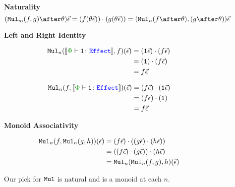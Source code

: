 \documentclass{report}
\begin{document}
\begin{figure}
    \begin{framed}
        \begin{framed}
            \centering\textbf{Naturality} 
            \begin{equation*}
                (\Mul_m(f, g)\after \theta)\ev = (f(\theta\ev))\dot(g(\theta\ev)) = (\Mul_n(f\after\theta), (g\after\theta))\ev
            \end{equation*}
        \end{framed} 
        
        \begin{framed}
            \centering\textbf{Left and Right Identity}
            \begin{minipage}{.45\textwidth}
                \begin{align*}
                    \Mul_n(\deno{\typerelation{\P}{\1}{\effect}}, f)(\ev) & = (\1\ev)\dot(f\ev)\\
                    & = (\1)\dot(f\ev)\\
                    & = f\ev\\
                \end{align*}
            \end{minipage}
            \quad
            \begin{minipage}{.45\textwidth}
                \begin{align*}
                    \Mul_n(f, \deno{\typerelation{\P}{\1}{\effect}})(\ev) & = (f\ev)\dot(\1\ev)\\
                    & = (f\ev)\dot(\1)\\
                    & = f\ev\\
                \end{align*}
            \end{minipage}
        \end{framed}

        \begin{framed}
            \centering\textbf{Monoid Associativity}

            \begin{align*}
                \texttt{Mul}_n(f, \texttt{Mul}_n(g, h))(\vec{\epsilon}) & = (f\vec{\epsilon})\cdot((g\vec{\epsilon})\cdot(h\vec{\epsilon}))\\
                & = ((f\vec{\epsilon})\cdot(g\vec{\epsilon}))\cdot(h\vec{\epsilon})\\
                & = \texttt{Mul}_n(\texttt{Mul}_n(f,g), h)(\vec{\epsilon})
            \end{align*}
        \end{framed}
    \end{framed}
    
    
    \caption{Our pick for $\texttt{Mul}$ is natural and is a monoid at each $n$.}
    \label{MulMonoidAndNatural}
\end{figure}
\end{document}
